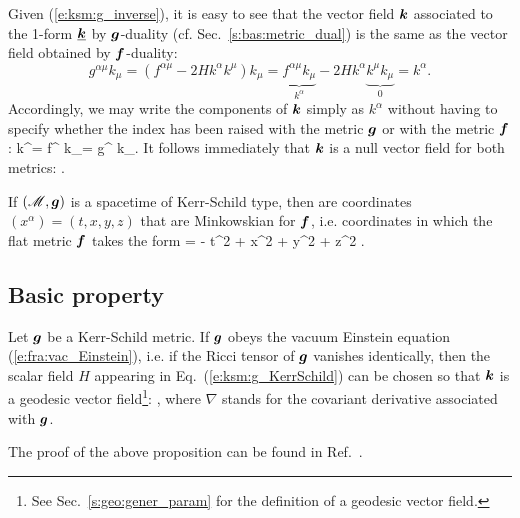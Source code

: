 Given (\ref{e:ksm:g_inverse}), it is easy to see that the vector field
$\bm{k}$ associated
to the 1-form $\underline{\bm{k}}$ by $\bm{g}$-duality (cf. Sec.~\ref{s:bas:metric_dual})
is the same as the vector field
obtained by $\bm{f}$-duality:
\[
    g^{\alpha\mu} k_\mu = (f^{\alpha\mu} - 2 H k^\alpha k^\mu) k_\mu
                        = \underbrace{f^{\alpha\mu} k_\mu}_{k^\alpha}
                          - 2H k^\alpha \underbrace{k^\mu k_\mu}_{0}
                        = k^\alpha .
\]
Accordingly, we may write the components of $\bm{k}$ simply as $k^\alpha$
without having to specify whether the index has been raised with the
metric $\bm{g}$ or with the metric $\bm{f}$:
\be
    k^\alpha = f^{\alpha\mu} k_\mu  = g^{\alpha\mu} k_\mu .
\ee
It follows immediately that $\bm{k}$ is a null vector field for
both metrics:
\be
   .
\ee


If $(\mathscr{M},\bm{g})$ is a spacetime of Kerr-Schild type, then 
are coordinates $(x^\alpha) = (t,x,y,z)$ that are Minkowskian
for $\bm{f}$, i.e. coordinates in which the flat metric
$\bm{f}$ takes the form
\be \label{e:ksm:ds_eta}
     = - \dd t^2 + \dd x^2 + \dd y^2 + \dd z^2 .
\ee

\subsection{Basic property}

\begin{prop}
Let $\bm{g}$ be a Kerr-Schild metric.
If $\bm{g}$ obeys the vacuum Einstein
equation
(\ref{e:fra:vac_Einstein}),
i.e. if the Ricci tensor of $\bm{g}$ vanishes identically,
then the scalar field $H$ appearing in Eq.~(\ref{e:ksm:g_KerrSchild})
can be chosen so that $\bm{k}$ is a geodesic vector field\footnote{See Sec.~\ref{s:geo:gener_param} for the definition of a geodesic vector field.}:
\be \label{e:ksm:k_geodesic}
    ,
\ee
where $\nabla$ stands for the covariant derivative associated with $\bm{g}$.
\end{prop}

The proof of the above proposition can be found in Ref.~\cite{KerrS65}.



